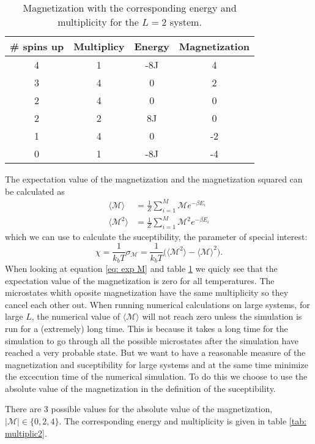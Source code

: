 \documentclass[11pt,a4wide]{article}
\begin{document}
\begin{table}
\centering
\caption{Magnetization with the corresponding energy and multiplicity for the $L=2$ system.}
\begin{tabular}{|c|c|c|c|}
\hline 
\# spins up & Multiplicy & Energy & Magnetization \\ 
\hline 
4 & 1 & -8J & 4 \\ 
\hline 
3 & 4 & 0 & 2 \\ 
\hline 
2 & 4 & 0 & 0 \\ 
\hline 
2 & 2 & 8J & 0 \\ 
\hline 
1 & 4 & 0 & -2 \\ 
\hline 
0 & 1 & -8J & -4 \\ 
\hline 
\end{tabular} 
\label{tab: multiplic}
\end{table}
The expectation value of the magnetization and the magnetization squared can be calculated as
\begin{align}
\langle \mathcal{M} \rangle &= \frac{1}{Z}\sum_{i=1}^M \mathcal{M}  e^{-\beta E_i} \label{eq: exp M} \\
\langle \mathcal{M}^2 \rangle &= \frac{1}{Z}\sum_{i=1}^M \mathcal{M}^2  e^{-\beta E_i} \nonumber
\end{align}
which we can use to calculate the suceptibility, the parameter of special interest: 
\[
\chi = \frac{1}{k_bT}\sigma_\mathcal{M} = \frac{1}{k_bT}\big( \langle \mathcal{M}^2 \rangle - \langle \mathcal{M} \rangle^2 \big).
\]
When looking at equation \ref{eq: exp M} and table \ref{tab: multiplic} we quicly see that the expectation value of the magnetization is zero for all temperatures. The microstates whith oposite magnetization have the same multiplicity so they cancel each other out. When running numerical calculations on large systems, for large $L$, the numerical value of $\langle \mathcal{M} \rangle$ will not reach zero unless the simulation is run for a (extremely) long time. This is because it takes a long time for the simulation to go through all the possible microstates after the simulation have reached a very probable state. But we want to have a reasonable measure of the magnetization and suceptibility for large systems and at the same time minimize the excecution time of the numerical simulation. To do this we choose to use the absolute value of the magnetization in the definition of the suceptibility. 

There are 3 possible values for the absolute value of the magnetization, $|\mathcal{M}| \in \{0, 2, 4\}$.  The corresponding energy and multiplicity is given in table \ref{tab: multiplic2}. 
\end{document}
